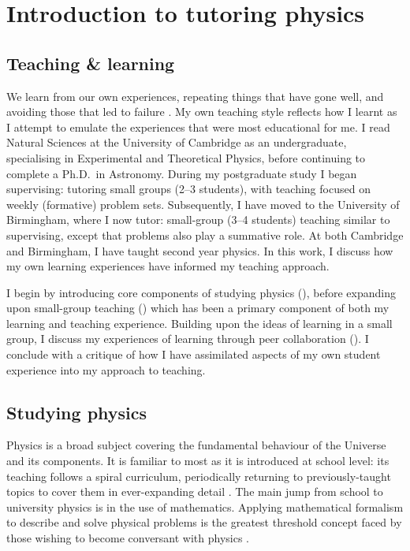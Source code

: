 \chapter{Introduction to tutoring physics}

\section{Teaching \& learning}

We learn from our own experiences, repeating things that have gone well, and avoiding those that led to failure \citep[chapter 2]{Skinner1954,Kolb1984}. My own teaching style reflects how I learnt as I attempt to emulate the experiences that were most educational for me. I read Natural Sciences at the University of Cambridge as an undergraduate, specialising in Experimental and Theoretical Physics, before continuing to complete a Ph.D.\ in Astronomy. During my postgraduate study I began supervising: tutoring small groups (2--3 students), with teaching focused on weekly (formative) problem sets. Subsequently, I have moved to the University of Birmingham, where I now tutor: small-group (3--4 students) teaching similar to supervising, except that problems also play a summative role. At both Cambridge and Birmingham, I have taught second year physics. In this work, I discuss how my own learning experiences have informed my teaching approach.

I begin by introducing core components of studying physics (), before expanding upon small-group teaching () which has been a primary component of both my learning and teaching experience. Building upon the ideas of learning in a small group, I discuss my experiences of learning through peer collaboration (). I conclude with a critique of how I have assimilated aspects of my own student experience into my approach to teaching.

\section{Studying physics}\label{sec:physics}

Physics is a broad subject covering the fundamental behaviour of the Universe and its components. It is familiar to most as it is introduced at school level: its teaching follows a spiral curriculum, periodically returning to previously-taught topics to cover them in ever-expanding detail \citep{Bruner1960}. The main jump from school to university physics is in the use of mathematics. Applying mathematical formalism to describe and solve physical problems is the greatest threshold concept \citep{Meyer2003} faced by those wishing to become conversant with physics \citep{Wigner1960}.

